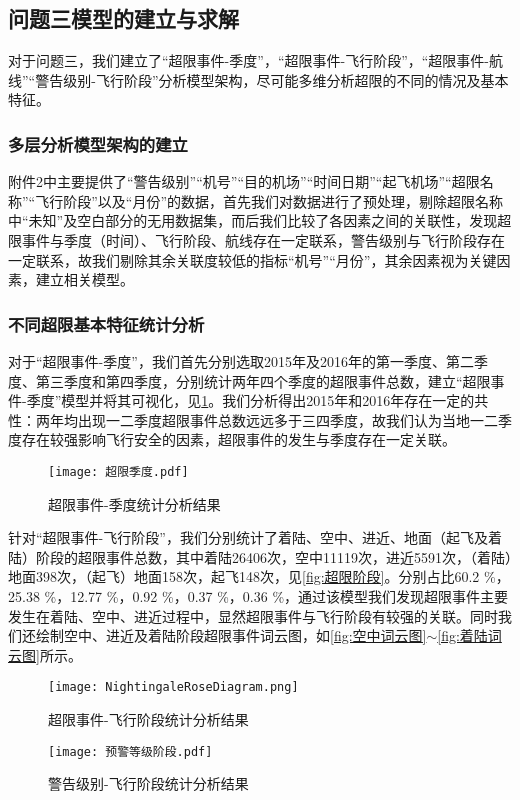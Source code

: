 \documentclass{MathorCupModeling}
\begin{document}
	\subsection{问题三模型的建立与求解}
	对于问题三，我们建立了“超限事件-季度”，“超限事件-飞行阶段”，“超限事件-航线”“警告级别-飞行阶段”分析模型架构，尽可能多维分析超限的不同的情况及基本特征。
	\subsubsection{多层分析模型架构的建立}
	附件2中主要提供了“警告级别”“机号”“目的机场”“时间日期”“起飞机场”“超限名称”“飞行阶段”以及“月份”的数据，首先我们对数据进行了预处理，剔除超限名称中“未知”及空白部分的无用数据集，而后我们比较了各因素之间的关联性，发现超限事件与季度（时间）、飞行阶段、航线存在一定联系，警告级别与飞行阶段存在一定联系，故我们剔除其余关联度较低的指标“机号”“月份”，其余因素视为关键因素，建立相关模型。
	\subsubsection{不同超限基本特征统计分析}
	
	对于“超限事件-季度”，我们首先分别选取2015年及2016年的第一季度、第二季度、第三季度和第四季度，分别统计两年四个季度的超限事件总数，建立“超限事件-季度”模型并将其可视化，见\textcolor{blue}{\cref{fig:超限季度}}。我们分析得出2015年和2016年存在一定的共性：两年均出现一二季度超限事件总数远远多于三四季度，故我们认为当地一二季度存在较强影响飞行安全的因素，超限事件的发生与季度存在一定关联。
	\begin{figure}[H]
		\centering
		\texttt{[image: 超限季度.pdf]}
		\caption{超限事件-季度统计分析结果}
		\label{fig:超限季度}
	\end{figure}
	针对“超限事件-飞行阶段”，我们分别统计了着陆、空中、进近、地面（起飞及着陆）阶段的超限事件总数，其中着陆26406次，空中11119次，进近5591次，（着陆）地面398次，（起飞）地面158次，起飞148次，见\textcolor{blue}{\cref{fig:超限阶段}}。分别占比60.2 \%，25.38 \%，12.77 \%，0.92 \%，0.37 \%，0.36 \%，通过该模型我们发现超限事件主要发生在着陆、空中、进近过程中，显然超限事件与飞行阶段有较强的关联。同时我们还绘制空中、进近及着陆阶段超限事件词云图，如\textcolor{blue}{\cref{fig:空中词云图}}$\sim$\textcolor{blue}{\cref{fig:着陆词云图}}所示。
	\begin{figure}[H]
		\centering
		\begin{minipage}{0.48\linewidth}
			\centering
			\texttt{[image: NightingaleRoseDiagram.png]}
			\caption{超限事件-飞行阶段统计分析结果}
			\label{fig:超限阶段}
		\end{minipage}
		\begin{minipage}{0.48\linewidth}
			\centering
			\texttt{[image: 预警等级阶段.pdf]}
			\caption{警告级别-飞行阶段统计分析结果}
			\label{fig:预警等级阶段}
		\end{minipage}
	\end{figure}
\end{document}
